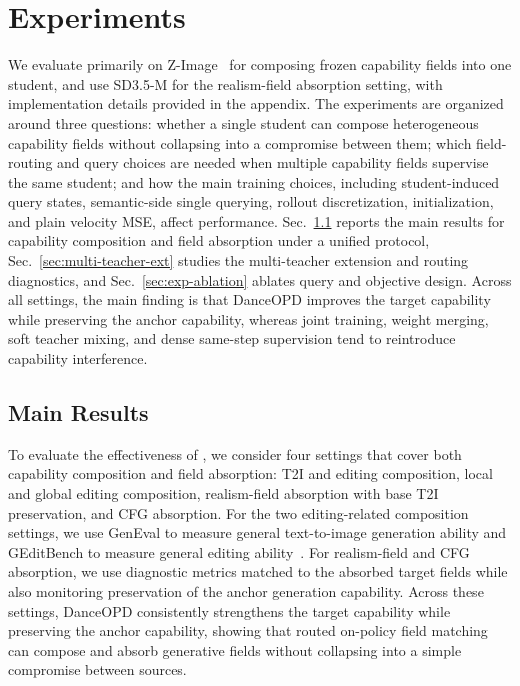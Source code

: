 \section{Experiments}
\label{sec:experiments}

We evaluate \name{} primarily on Z-Image~\cite{cai2025z} for composing frozen capability fields into one student, and use SD3.5-M for the realism-field absorption setting, with implementation details provided in the appendix. The experiments are organized around three questions: whether a single student can compose heterogeneous capability fields without collapsing into a compromise between them; which field-routing and query choices are needed when multiple capability fields supervise the same student; and how the main training choices, including student-induced query states, semantic-side single querying, rollout discretization, initialization, and plain velocity MSE, affect performance. Sec.~\ref{sec:main-results} reports the main results for capability composition and field absorption under a unified protocol, Sec.~\ref{sec:multi-teacher-ext} studies the multi-teacher extension and routing diagnostics, and Sec.~\ref{sec:exp-ablation} ablates query and objective design. Across all settings, the main finding is that DanceOPD improves the target capability while preserving the anchor capability, whereas joint training, weight merging, soft teacher mixing, and dense same-step supervision tend to reintroduce capability interference. 


\subsection{Main Results}
\label{sec:main-results}

To evaluate the effectiveness of \name{}, we consider four settings that cover both capability composition and field absorption: T2I and editing composition, local and global editing composition, realism-field absorption with base T2I preservation, and CFG absorption. For the two editing-related composition settings, we use GenEval to measure general text-to-image generation ability and GEditBench to measure general editing ability~\cite{ghosh2023geneval,liu2025step1x}. For realism-field and CFG absorption, we use diagnostic metrics matched to the absorbed target fields while also monitoring preservation of the anchor generation capability. Across these settings, DanceOPD consistently strengthens the target capability while preserving the anchor capability, showing that routed on-policy field matching can compose and absorb generative fields without collapsing into a simple compromise between sources.

